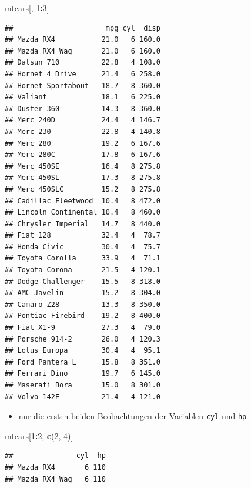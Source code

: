 \documentclass[12pt,a4paper]{article}
\newenvironment{Shaded}{\begin{snugshade}}{\end{snugshade}}
\newcommand{\DecValTok}[1]{\textcolor[rgb]{0.00,0.00,0.81}{#1}}
\newcommand{\FunctionTok}[1]{\textcolor[rgb]{0.13,0.29,0.53}{\textbf{#1}}}
\newcommand{\NormalTok}[1]{#1}
\newcommand{\SpecialCharTok}[1]{\textcolor[rgb]{0.81,0.36,0.00}{\textbf{#1}}}
\begin{document}
\begin{Shaded}
\begin{Highlighting}[]
\NormalTok{    mtcars[, }\DecValTok{1}\SpecialCharTok{:}\DecValTok{3}\NormalTok{]}
\end{Highlighting}
\end{Shaded}

\begin{verbatim}
##                      mpg cyl  disp
## Mazda RX4           21.0   6 160.0
## Mazda RX4 Wag       21.0   6 160.0
## Datsun 710          22.8   4 108.0
## Hornet 4 Drive      21.4   6 258.0
## Hornet Sportabout   18.7   8 360.0
## Valiant             18.1   6 225.0
## Duster 360          14.3   8 360.0
## Merc 240D           24.4   4 146.7
## Merc 230            22.8   4 140.8
## Merc 280            19.2   6 167.6
## Merc 280C           17.8   6 167.6
## Merc 450SE          16.4   8 275.8
## Merc 450SL          17.3   8 275.8
## Merc 450SLC         15.2   8 275.8
## Cadillac Fleetwood  10.4   8 472.0
## Lincoln Continental 10.4   8 460.0
## Chrysler Imperial   14.7   8 440.0
## Fiat 128            32.4   4  78.7
## Honda Civic         30.4   4  75.7
## Toyota Corolla      33.9   4  71.1
## Toyota Corona       21.5   4 120.1
## Dodge Challenger    15.5   8 318.0
## AMC Javelin         15.2   8 304.0
## Camaro Z28          13.3   8 350.0
## Pontiac Firebird    19.2   8 400.0
## Fiat X1-9           27.3   4  79.0
## Porsche 914-2       26.0   4 120.3
## Lotus Europa        30.4   4  95.1
## Ford Pantera L      15.8   8 351.0
## Ferrari Dino        19.7   6 145.0
## Maserati Bora       15.0   8 301.0
## Volvo 142E          21.4   4 121.0
\end{verbatim}

\begin{itemize}
  \item nur die ersten beiden Beobachtungen der Variablen \texttt{cyl} und \texttt{hp}
\end{itemize}

\begin{Shaded}
\begin{Highlighting}[]
\NormalTok{    mtcars[}\DecValTok{1}\SpecialCharTok{:}\DecValTok{2}\NormalTok{, }\FunctionTok{c}\NormalTok{(}\DecValTok{2}\NormalTok{, }\DecValTok{4}\NormalTok{)]}
\end{Highlighting}
\end{Shaded}

\begin{verbatim}
##               cyl  hp
## Mazda RX4       6 110
## Mazda RX4 Wag   6 110
\end{verbatim}
\end{document}
